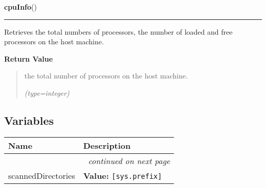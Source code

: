     \label{nMOLDYN:Core:Misc:cpuInfo}

    \vspace{0.5ex}

\hspace{.8\funcindent}\begin{boxedminipage}{\funcwidth}

    \raggedright \textbf{cpuInfo}()

    \vspace{-1.5ex}

    \rule{\textwidth}{0.5\fboxrule}
\setlength{\parskip}{2ex}
    Retrieves the total numbers of processors, the number of loaded and 
    free processors on the host machine.

\setlength{\parskip}{1ex}
      \textbf{Return Value}
    \vspace{-1ex}

      \begin{quote}
      the total number of processors on the host machine.

      {\it (type=integer)}

      \end{quote}

    \end{boxedminipage}



  \subsection{Variables}

    \vspace{-1cm}
\hspace{\varindent}\begin{longtable}{|p{\varnamewidth}|p{\vardescrwidth}|l}
\cline{1-2}
\cline{1-2} \centering \textbf{Name} & \centering \textbf{Description}& \\
\cline{1-2}
\endhead\cline{1-2}\multicolumn{3}{r}{\small\textit{continued on next page}}\\\endfoot\cline{1-2}
\endlastfoot\raggedright s\-c\-a\-n\-n\-e\-d\-D\-i\-r\-e\-c\-t\-o\-r\-i\-e\-s\- & \raggedright \textbf{Value:} 
{\tt [sys.prefix]}&\\
\cline{1-2}
\end{longtable}

